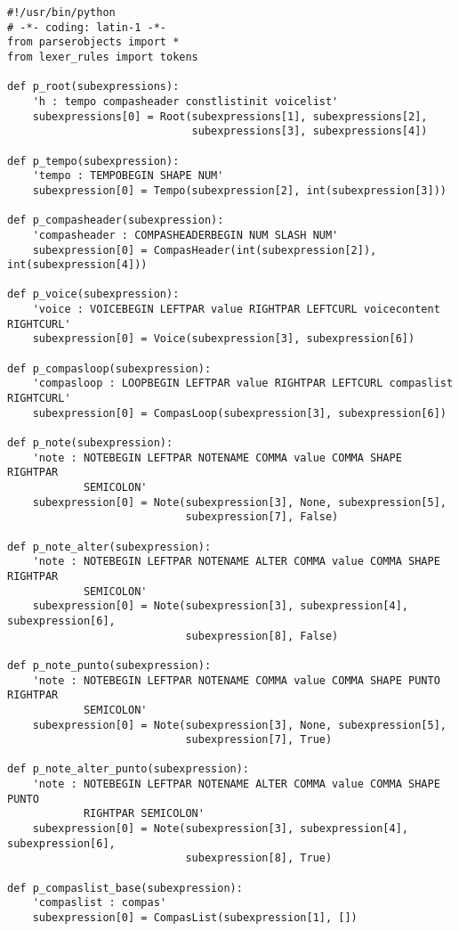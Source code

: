 \begin{verbatim}
#!/usr/bin/python
# -*- coding: latin-1 -*-
from parserobjects import *
from lexer_rules import tokens

def p_root(subexpressions):
    'h : tempo compasheader constlistinit voicelist'
    subexpressions[0] = Root(subexpressions[1], subexpressions[2],
                             subexpressions[3], subexpressions[4])

def p_tempo(subexpression):
    'tempo : TEMPOBEGIN SHAPE NUM'
    subexpression[0] = Tempo(subexpression[2], int(subexpression[3]))

def p_compasheader(subexpression):
    'compasheader : COMPASHEADERBEGIN NUM SLASH NUM'
    subexpression[0] = CompasHeader(int(subexpression[2]), int(subexpression[4]))

def p_voice(subexpression):
    'voice : VOICEBEGIN LEFTPAR value RIGHTPAR LEFTCURL voicecontent RIGHTCURL'
    subexpression[0] = Voice(subexpression[3], subexpression[6])

def p_compasloop(subexpression):
    'compasloop : LOOPBEGIN LEFTPAR value RIGHTPAR LEFTCURL compaslist RIGHTCURL'
    subexpression[0] = CompasLoop(subexpression[3], subexpression[6])

def p_note(subexpression):
    'note : NOTEBEGIN LEFTPAR NOTENAME COMMA value COMMA SHAPE RIGHTPAR
            SEMICOLON'
    subexpression[0] = Note(subexpression[3], None, subexpression[5],
                            subexpression[7], False)

def p_note_alter(subexpression):
    'note : NOTEBEGIN LEFTPAR NOTENAME ALTER COMMA value COMMA SHAPE RIGHTPAR
            SEMICOLON'
    subexpression[0] = Note(subexpression[3], subexpression[4], subexpression[6],
                            subexpression[8], False)

def p_note_punto(subexpression):
    'note : NOTEBEGIN LEFTPAR NOTENAME COMMA value COMMA SHAPE PUNTO RIGHTPAR
            SEMICOLON'
    subexpression[0] = Note(subexpression[3], None, subexpression[5],
                            subexpression[7], True)

def p_note_alter_punto(subexpression):
    'note : NOTEBEGIN LEFTPAR NOTENAME ALTER COMMA value COMMA SHAPE PUNTO
            RIGHTPAR SEMICOLON'
    subexpression[0] = Note(subexpression[3], subexpression[4], subexpression[6],
                            subexpression[8], True)

def p_compaslist_base(subexpression):
    'compaslist : compas'
    subexpression[0] = CompasList(subexpression[1], [])


\end{verbatim}
